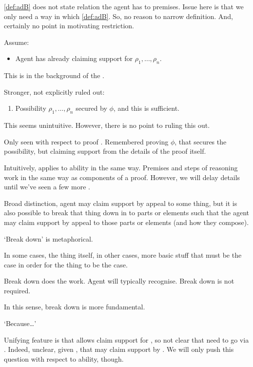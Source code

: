 \begin{note}
  \autoref{def:adB} does not state relation the agent has to premises.
  Issue here is that we only need a way in which \autoref{def:adB}.
  So, no reason to narrow definition.
  And, certainly no point in motivating restriction.

  Assume:
  \begin{itemize}
  \item Agent has already claiming support for \(\rho_{1},\dots,\rho_{n}\).
  \end{itemize}

  This is in the background of the .

  Stronger, not explicitly ruled out:

  \begin{enumerate}
  \item Possibility \(\rho_{1},\dots,\rho_{n}\) secured by \(\phi\), and this is sufficient.
  \end{enumerate}

  This seems unintuitive.
  However, there is no point to ruling this out.
\end{note}

\begin{note}
  Only seen \adB{} with respect to proof .
  Remembered proving \(\phi\), that secures the possibility, but claiming support from the details of the proof itself.

  Intuitively, applies to ability in the same way.
  Premises and steps of reasoning work in the same way as components of a proof.
  However, we will delay details until we've seen a few more .
\end{note}

\begin{note}
  Broad distinction, agent may claim support by appeal to some thing, but it is also possible to break that thing down in to parts or elements such that the agent may claim support by appeal to those parts or elements (and how they compose).

  `Break down' is metaphorical.

  In some cases, the thing itself, in other cases, more basic stuff that must be the case in order for the thing to be the case.

  Break down does the work.
  Agent will typically recognise.
  Break down is not required.

  In this sense, break down is more fundamental.

  `Because\dots'

  Unifying feature is that \adA{} allows claim support for \adB{}, so not clear that need to go via \adB{}.
  Indeed, unclear, given \ESU{}, that may claim support by \adB{}.
  We will only push this question with respect to ability, though.
\end{note}

